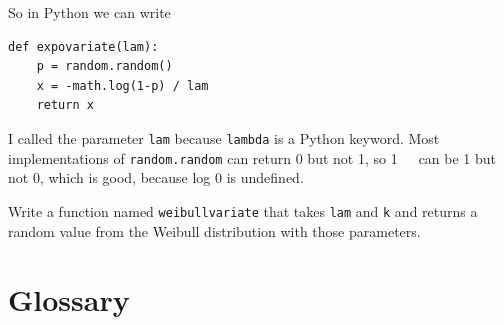 \documentclass[12pt]{book}
\begin{document}

So in Python we can write
%
\begin{verbatim}
def expovariate(lam):
    p = random.random()
    x = -math.log(1-p) / lam
    return x
\end{verbatim}

I called the parameter \verb"lam" because \verb"lambda" is a Python
keyword.  Most implementations of {\tt random.random} can return 0 but
not 1, so 1~\minus~\p~can be 1 but not 0, which is good, because log 0 is
undefined.

\begin{exercise}
Write a function named \verb"weibullvariate" that takes
\verb"lam" and \verb"k" and returns a random value from the Weibull
distribution with those parameters.

\end{exercise}


\section{Glossary}
\end{document}
